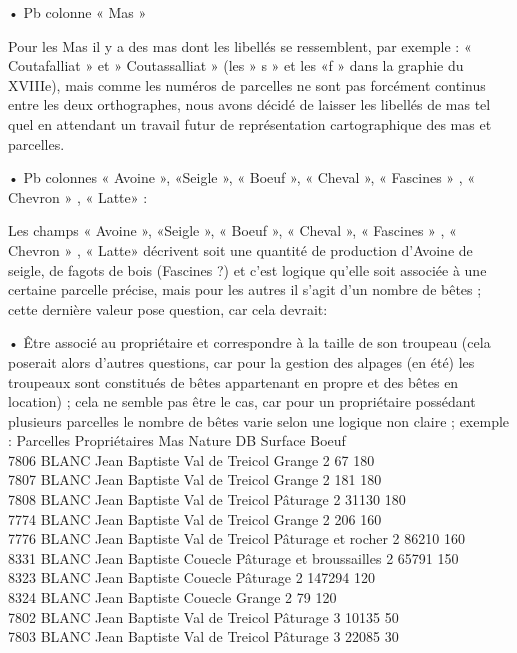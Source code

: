 \documentclass[12pt,a4paper]{report}
\begin{document}
•	Pb colonne « Mas »

Pour les Mas il y a des mas dont les libellés se ressemblent, par exemple : « Coutafalliat » et » Coutassalliat » (les » s » et les «f » dans la graphie du XVIIIe), mais comme les numéros de parcelles ne sont pas forcément continus entre les deux orthographes, nous avons décidé de laisser les libellés de mas tel quel en attendant un travail futur de représentation cartographique des mas et parcelles.

•	Pb colonnes « Avoine », «Seigle », « Boeuf », « Cheval », « Fascines » , « Chevron » , « Latte» :

Les champs « Avoine », «Seigle », « Boeuf », « Cheval », « Fascines » , « Chevron » , « Latte» décrivent soit une quantité de production d’Avoine de seigle, de fagots de bois (Fascines ?) et c’est logique qu’elle soit associée à une certaine parcelle précise, mais pour les autres il s’agit d’un nombre de bêtes ; cette dernière valeur pose question, car cela devrait:

•	Être associé au propriétaire et correspondre à la taille de son troupeau (cela poserait alors d’autres questions, car pour la gestion des alpages (en été) les troupeaux sont constitués de bêtes appartenant en propre et des bêtes en location) ; cela ne semble pas être le cas, car pour un propriétaire possédant plusieurs parcelles le nombre de bêtes varie selon une logique non claire ; exemple :
Parcelles	Propriétaires	Mas	Nature	DB	Surface	Boeuf\\
7806	BLANC Jean Baptiste	Val de Treicol	Grange	2	67	180\\
7807	BLANC Jean Baptiste	Val de Treicol	Grange	2	181	180\\
7808	BLANC Jean Baptiste	Val de Treicol	Pâturage	2	31130	180\\
7774	BLANC Jean Baptiste	Val de Treicol	Grange	2	206	160\\
7776	BLANC Jean Baptiste	Val de Treicol	Pâturage et rocher	2	86210	160\\
8331	BLANC Jean Baptiste	Couecle	Pâturage et broussailles	2	65791	150\\
8323	BLANC Jean Baptiste	Couecle	Pâturage	2	147294	120\\
8324	BLANC Jean Baptiste	Couecle	Grange	2	79	120\\
7802	BLANC Jean Baptiste	Val de Treicol	Pâturage	3	10135	50\\
7803	BLANC Jean Baptiste	Val de Treicol	Pâturage	3	22085	30\\
\end{document}
